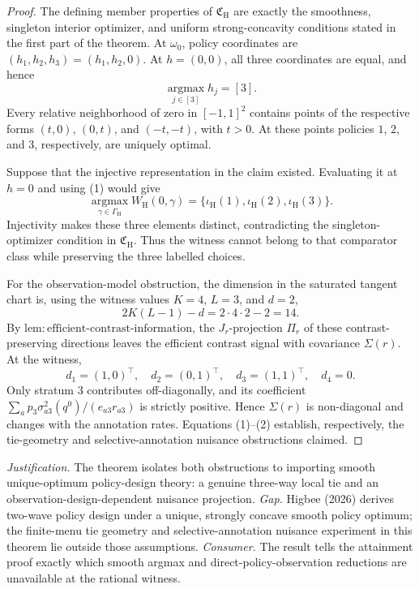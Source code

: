 \documentclass{article}
\begin{document}
\begin{proof}
The defining member properties of \(\mathfrak C_{\mathrm H}\) are exactly the smoothness, singleton interior optimizer, and uniform strong-concavity conditions stated in the first part of the theorem.  At \(\omega_0\), policy coordinates are \((h_1,h_2,h_3)=(h_1,h_2,0)\).  At \(h=(0,0)\), all three coordinates are equal, and hence
\[
 \operatorname*{argmax}_{j\in[3]}h_j=[3].                            \tag{1}
\]
Every relative neighborhood of zero in \([-1,1]^2\) contains points of the respective forms \((t,0)\), \((0,t)\), and \((-t,-t)\), with \(t>0\).  At these points policies \(1\), \(2\), and \(3\), respectively, are uniquely optimal.

Suppose that the injective representation in the claim existed.  Evaluating it at \(h=0\) and using (1) would give
\[
 \operatorname*{argmax}_{\gamma\in\Gamma_{\mathrm H}}W_{\mathrm H}(0,\gamma)
 =\{\iota_{\mathrm H}(1),\iota_{\mathrm H}(2),\iota_{\mathrm H}(3)\}.
\]
Injectivity makes these three elements distinct, contradicting the singleton-optimizer condition in \(\mathfrak C_{\mathrm H}\).  Thus the witness cannot belong to that comparator class while preserving the three labelled choices.

For the observation-model obstruction, the dimension in the saturated tangent chart is, using the witness values \(K=4\), \(L=3\), and \(d=2\),
\[
 2K(L-1)-d=2\cdot4\cdot2-2=14.                                     \tag{2}
\]
By \(\mathrm{lem:efficient\text{-}contrast\text{-}information}\), the \(J_r\)-projection \(\Pi_r\) of these contrast-preserving directions leaves the efficient contrast signal with covariance \(\Sigma(r)\).  At the witness,
\[
 d_1=(1,0)^\top,\quad d_2=(0,1)^\top,\quad d_3=(1,1)^\top,\quad d_4=0.
\]
Only stratum \(3\) contributes off-diagonally, and its coefficient \(\sum_a p_3\sigma^2_{a3}(q^0)/(e_{a3}r_{a3})\) is strictly positive.  Hence \(\Sigma(r)\) is non-diagonal and changes with the annotation rates.  Equations (1)--(2) establish, respectively, the tie-geometry and selective-annotation nuisance obstructions claimed.
\end{proof}
\par\smallskip\noindent \textit{Justification.} The theorem isolates both obstructions to importing smooth unique-optimum policy-design theory: a genuine three-way local tie and an observation-design-dependent nuisance projection. \textit{Gap.} Higbee (2026) derives two-wave policy design under a unique, strongly concave smooth policy optimum; the finite-menu tie geometry and selective-annotation nuisance experiment in this theorem lie outside those assumptions. \textit{Consumer.} The result tells the attainment proof exactly which smooth argmax and direct-policy-observation reductions are unavailable at the rational witness.
\end{document}
